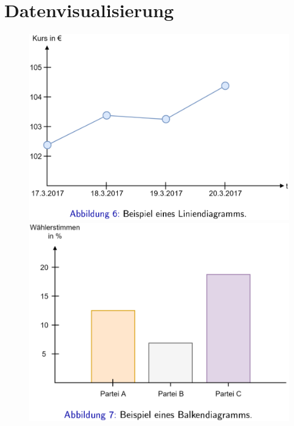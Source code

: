 \documentclass{report}
\begin{document}
\section{Datenvisualisierung}
\begin{figure}[H]
  \centering
  \begin{minipage}[b]{0.4\textwidth}
    \includegraphics[scale=.25]{ml01_4}
  \end{minipage}
  \hfill
  \begin{minipage}[b]{0.4\textwidth}
    \includegraphics[scale=.25]{ml01_5}
  \end{minipage}
\end{figure}
\end{document}
